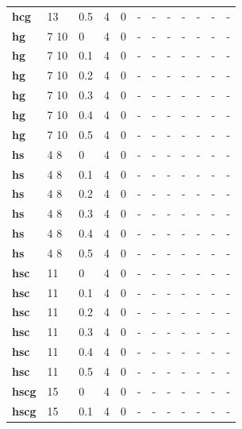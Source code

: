 \begin{longtable}[h]{|p{0.8cm}|p{1.5cm}|p{1cm}|p{1cm}|p{1cm}|p{1cm}|p{1cm}|p{1cm}|p{1cm}|p{1cm}|p{1cm}|p{1.5cm}|}
           \\
  \textbf{hcg } &  13         & 0.5 & 4 & 0 & - & - & - & - & - & - & -
           \\
  \textbf{hg  } &  7 10       &   0 & 4 & 0 & - & - & - & - & - & - & -
           \\
  \textbf{hg  } &  7 10       & 0.1 & 4 & 0 & - & - & - & - & - & - & -
           \\
  \textbf{hg  } &  7 10       & 0.2 & 4 & 0 & - & - & - & - & - & - & -
           \\
  \textbf{hg  } &  7 10       & 0.3 & 4 & 0 & - & - & - & - & - & - & -
           \\
  \textbf{hg  } &  7 10       & 0.4 & 4 & 0 & - & - & - & - & - & - & -
           \\
  \textbf{hg  } &  7 10       & 0.5 & 4 & 0 & - & - & - & - & - & - & -
           \\
  \textbf{hs  } &  4 8        &   0 & 4 & 0 & - & - & - & - & - & - & -
           \\
  \textbf{hs  } &  4 8        & 0.1 & 4 & 0 & - & - & - & - & - & - & -
           \\
  \textbf{hs  } &  4 8        & 0.2 & 4 & 0 & - & - & - & - & - & - & -
           \\
  \textbf{hs  } &  4 8        & 0.3 & 4 & 0 & - & - & - & - & - & - & -
           \\
  \textbf{hs  } &  4 8        & 0.4 & 4 & 0 & - & - & - & - & - & - & -
           \\
  \textbf{hs  } &  4 8        & 0.5 & 4 & 0 & - & - & - & - & - & - & -
           \\
  \textbf{hsc } &  11         &   0 & 4 & 0 & - & - & - & - & - & - & -
           \\
  \textbf{hsc } &  11         & 0.1 & 4 & 0 & - & - & - & - & - & - & -
           \\
  \textbf{hsc } &  11         & 0.2 & 4 & 0 & - & - & - & - & - & - & -
           \\
  \textbf{hsc } &  11         & 0.3 & 4 & 0 & - & - & - & - & - & - & -
           \\
  \textbf{hsc } &  11         & 0.4 & 4 & 0 & - & - & - & - & - & - & -
           \\
  \textbf{hsc } &  11         & 0.5 & 4 & 0 & - & - & - & - & - & - & -
           \\
  \textbf{hscg} &  15         &   0 & 4 & 0 & - & - & - & - & - & - & -
           \\
  \textbf{hscg} &  15         & 0.1 & 4 & 0 & - & - & - & - & - & - & -

\end{longtable}
